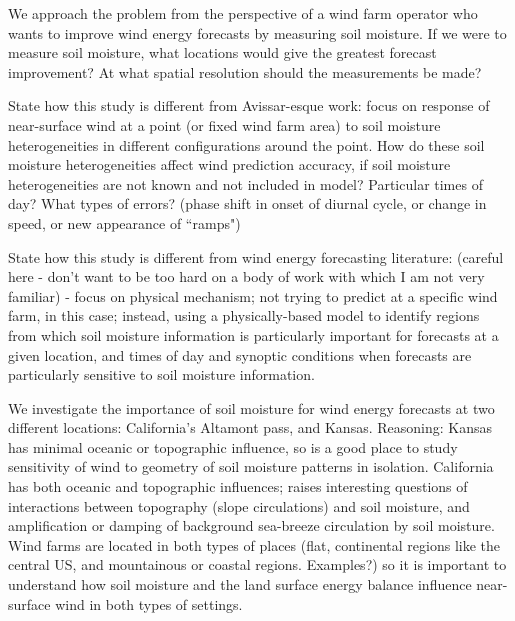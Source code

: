 \documentclass[12pt]{amsart}
\begin{document}
We approach the problem from the perspective of a wind farm operator who wants to improve wind energy forecasts by measuring soil moisture.  If we were to measure soil moisture, what locations would give the greatest forecast improvement?  At what spatial resolution should the measurements be made?

State how this study is different from Avissar-esque work: focus on response of near-surface wind at a point (or fixed wind farm area) to soil moisture heterogeneities in different configurations around the point.  How do these soil moisture heterogeneities affect wind prediction accuracy, if soil moisture heterogeneities are not known and not included in model?  Particular times of day?  What types of errors?  (phase shift in onset of diurnal cycle, or change in speed, or new appearance of ``ramps")

State how this study is different from wind energy forecasting literature: (careful here - don't want to be too hard on a body of work with which I am not very familiar) - focus on physical mechanism; not trying to predict at a specific wind farm, in this case; instead, using a physically-based model to identify regions from which soil moisture information is particularly important for forecasts at a given location, and times of day and synoptic conditions when forecasts are particularly sensitive to soil moisture information.

We investigate the importance of soil moisture for wind energy forecasts at two different locations: California's Altamont pass, and Kansas.  Reasoning: Kansas has minimal oceanic or topographic influence, so is a good place to study sensitivity of wind to geometry of soil moisture patterns in isolation.  California has both oceanic and topographic influences; raises interesting questions of interactions between topography (slope circulations) and soil moisture, and amplification or damping of background sea-breeze circulation by soil moisture.  Wind farms are located in both types of places (flat, continental regions like the central US, and mountainous or coastal regions. Examples?) so it is important to understand how soil moisture and the land surface energy balance influence near-surface wind in both types of settings.
\end{document}

